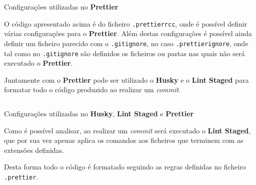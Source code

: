 \label{prettierAttachments}


\begin{longlisting}
	\inputminted{json}{code/prettier/config.json}
	\caption{Configurações utilizadas no \textbf{Prettier}}
\end{longlisting}

O código apresentado acima é do ficheiro \verb|.prettierrcc|, onde é possível definir várias configurações para o \textbf{Prettier}. Além destas configurações é possível ainda definir um ficheiro parecido com o \verb|.gitignore|, no caso \verb|.prettierignore|, onde tal como no \verb|.gitignore| são definidos os ficheiros ou pastas nas quais não será executado o \textbf{Prettier}.


Juntamente com o \textbf{Prettier} pode ser utilizado o \textbf{Husky} e o \textbf{Lint Staged} para formatar todo o código produzido ao realizar um \textit{commit}.

\begin{longlisting}
	\inputminted{json}{code/prettier/husky.json}
	\caption{Configurações utilizadas no \textbf{Husky}, \textbf{Lint Staged} e \textbf{Prettier}}
\end{longlisting}

Como é possível analisar, ao realizar um \textit{commit} será executado o \textbf{Lint Staged}, que por sua vez apenas aplica os comandos aos ficheiros que terminem com as extensões definidas.

Desta forma todo o código é formatado seguindo as regras definidas no ficheiro \verb|.prettier|.